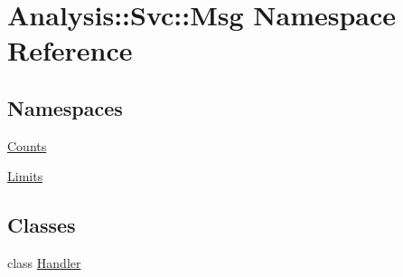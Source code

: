 \hypertarget{namespaceAnalysis_1_1Svc_1_1Msg}{}\section{Analysis\+:\+:Svc\+:\+:Msg Namespace Reference}
\label{namespaceAnalysis_1_1Svc_1_1Msg}
\subsection*{Namespaces}
\begin{DoxyCompactItemize}
\item 
 \hyperlink{namespaceAnalysis_1_1Svc_1_1Msg_1_1Counts}{Counts}
\item 
 \hyperlink{namespaceAnalysis_1_1Svc_1_1Msg_1_1Limits}{Limits}
\end{DoxyCompactItemize}
\subsection*{Classes}
\begin{DoxyCompactItemize}
\item 
class \hyperlink{classAnalysis_1_1Svc_1_1Msg_1_1Handler}{Handler}
\end{DoxyCompactItemize}

